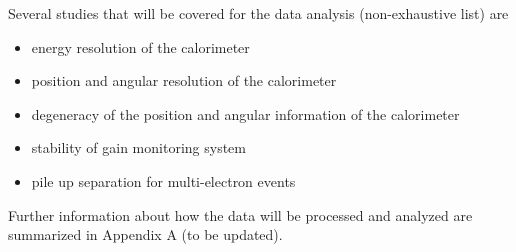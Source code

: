 Several studies that will be covered for the data analysis (non-exhaustive list) are
\begin{itemize}
\item energy resolution of the calorimeter
\item position and angular resolution of the calorimeter
\item degeneracy of the position and angular information of the calorimeter
\item stability of gain monitoring system
\item pile up separation for multi-electron events
\end{itemize}

Further information about how the data will be processed and analyzed are summarized in Appendix A (to be updated).


